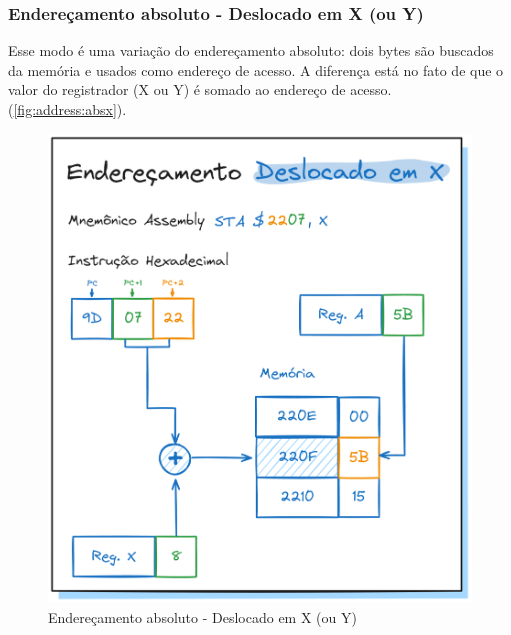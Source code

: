 \documentclass[
	12pt,				  %
	openright,		%
	a4paper,			%
	english,			%
	french,				%
	spanish,			%
	brazil,				%
]{abntex2}
\begin{document}
\subsubsection{Endereçamento absoluto - Deslocado em X (ou Y)}
Esse modo é uma variação do endereçamento absoluto: dois bytes são buscados da
memória e usados como endereço de acesso. A diferença está no fato de que o
valor do registrador (X ou Y) é somado ao endereço de acesso.
(\autoref{fig:address:absx}).
\begin{figure}[h]
	\centering
	\caption{Endereçamento absoluto - Deslocado em X (ou Y)}
	\label{fig:address:absx}
	\includegraphics[scale=0.25]{../assets/img/addressing-modes-absx.png}
\end{figure}
\end{document}
